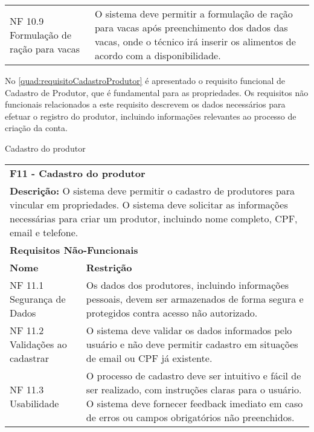 \begin{tabframed}[htb]
\begin{tabular}{|l|l|}
    \multicolumn{1}{|p{3cm}|}{\raggedright NF 10.9 Formulação de ração para vacas}    &
    \multicolumn{1}{|p{12cm}|}{\raggedright O sistema deve permitir a formulação de ração para vacas após preenchimento dos dados das vacas, onde o técnico irá inserir os alimentos de acordo com a disponibilidade.}
    \\ \cline{1-2}
  \end{tabular}
  \fonte{} %
\end{tabframed}

No \autoref{quad:requisitoCadastroProdutor} é apresentado o requisito funcional de Cadastro de Produtor, que é fundamental para as propriedades. Os requisitos não funcionais relacionados a este requisito descrevem os dados necessários para efetuar o registro do produtor, incluindo informações relevantes ao processo de criação da conta.

\begin{tabframed}[htb]
  \caption{Cadastro do produtor}
  \label{quad:requisitoCadastroProdutor}
  \renewcommand{\arraystretch}{1.5}
  \begin{tabular}{|l|l|}
    \cline{1-2}
    \multicolumn{2}{|l|}{\textbf{F11 - Cadastro do produtor} }
    \\ \cline{1-2}

    \multicolumn{2}{|p{15cm}|}{
    \raggedright \textbf{Descrição:} O sistema deve permitir o cadastro de produtores para vincular em propriedades. O sistema deve solicitar as informações necessárias para criar um produtor, incluindo nome completo, CPF, email e telefone.
    }
    \\ \cline{1-2}

    \multicolumn{2}{|l|}{\textbf{Requisitos Não-Funcionais}}
    \\ \cline{1-2}

    \textbf{Nome}                   &
    \textbf{Restrição}
    \\ \cline{1-2}

    NF 11.1 Segurança de Dados      &
    \multicolumn{1}{|p{8cm}|}{\raggedright Os dados dos produtores, incluindo informações pessoais, devem ser armazenados de forma segura e protegidos contra acesso não autorizado.}
    \\ \cline{1-2}

    NF 11.2 Validações ao cadastrar &
    \multicolumn{1}{|p{8cm}|}{\raggedright O sistema deve validar os dados informados pelo usuário e não deve permitir cadastro em situações de email ou CPF já existente.}
    \\ \cline{1-2}

    NF 11.3 Usabilidade             &
    \multicolumn{1}{|p{8cm}|}{\raggedright O processo de cadastro deve ser intuitivo e fácil de ser realizado, com instruções claras para o usuário. O sistema deve fornecer feedback imediato em caso de erros ou campos obrigatórios não preenchidos.}
    \\ \cline{1-2}
  \end{tabular}
  \fonte{} %
\end{tabframed}

